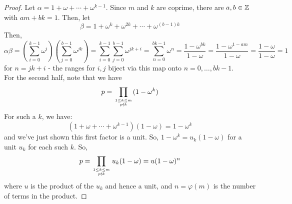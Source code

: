 \begin{proof} 
    Let $\alpha = 1+\omega+\cdots+\omega^{k-1}$. Since $m$ and $k$ are coprime, there are $a,b \in \mathbb{Z}$ with $am+bk = 1$. Then, let
    \[ \beta = 1+\omega^k+\omega^{2k}+\cdots+\omega^{(b-1)k} \]
    Then,
    \[ \alpha\beta = \left(\sum_{i=0}^{k-1} \omega^i\right)\left(\sum_{j=0}^{b-1} \omega^{jk}\right) = \sum_{i=0}^{k-1} \sum_{j=0}^{b-1} \omega^{jk+i} = \sum_{n=0}^{bk-1} \omega^n = \frac{1-\omega^{bk}}{1-\omega} = \frac{1-\omega^{1-am}}{1-\omega} = \frac{1-\omega}{1-\omega} = 1 \]
    for $n = jk+i$ - the ranges for $i,j$ biject via this map onto $n=0,\ldots,bk-1$. \\

    For the second half, note that we have
    \[ p = \prod_{1 \leq k \leq m \atop p \nmid k} (1-\omega^k) \]
    For such a $k$, we have:
    \[ (1+\omega+\cdots+\omega^{k-1})(1-\omega) = 1-\omega^k \]
    and we've just shown this first factor is a unit. So, $1-\omega^k = u_k(1-\omega)$ for a unit $u_k$ for each such $k$. So,
    \[ p = \prod_{1 \leq k \leq m \atop p \nmid k} u_k(1-\omega) = u(1-\omega)^n \]
    where $u$ is the product of the $u_k$ and hence a unit, and $n = \varphi(m)$ is the number of terms in the product.
\end{proof}
